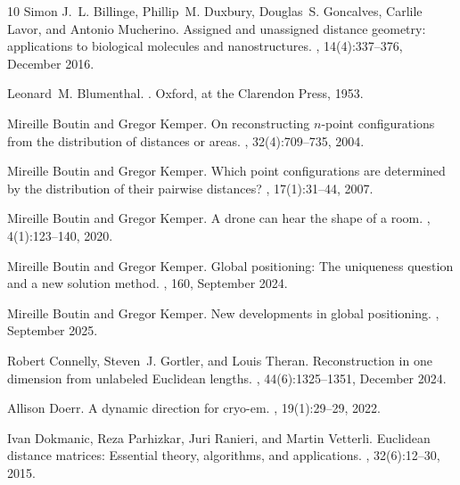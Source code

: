 \documentclass{article}
\theoremstyle{definition}
\renewcommand{\|}{|}
\begin{document}
\begin{thebibliography}{10}
Simon J.~L. Billinge, Phillip~M. Duxbury, Douglas~S. Goncalves, Carlile
  Lavor, and Antonio Mucherino.
\newblock Assigned and unassigned distance geometry: applications to biological
  molecules and nanostructures.
, 14(4):337--376, December 2016.

Leonard~M. Blumenthal.
.
\newblock Oxford, at the Clarendon Press, 1953.

Mireille Boutin and Gregor Kemper.
\newblock On reconstructing {$n$}-point configurations from the distribution of
  distances or areas.
, 32(4):709--735, 2004.

Mireille Boutin and Gregor Kemper.
\newblock Which point configurations are determined by the distribution of
  their pairwise distances?
, 17(1):31--44, 2007.

Mireille Boutin and Gregor Kemper.
\newblock A drone can hear the shape of a room.
, 4(1):123--140,
  2020.

Mireille Boutin and Gregor Kemper.
\newblock Global positioning: The uniqueness question and a new solution
  method.
, 160, September 2024.

Mireille Boutin and Gregor Kemper.
\newblock New developments in global positioning.
,
  September 2025.

Robert Connelly, Steven~J. Gortler, and Louis Theran.
\newblock Reconstruction in one dimension from unlabeled {E}uclidean lengths.
, 44(6):1325--1351, December 2024.

Allison Doerr.
\newblock A dynamic direction for cryo-em.
, 19(1):29--29, 2022.

Ivan Dokmanic, Reza Parhizkar, Juri Ranieri, and Martin Vetterli.
\newblock Euclidean distance matrices: Essential theory, algorithms, and
  applications.
, 32(6):12--30, 2015.


\end{thebibliography}
\end{document}
